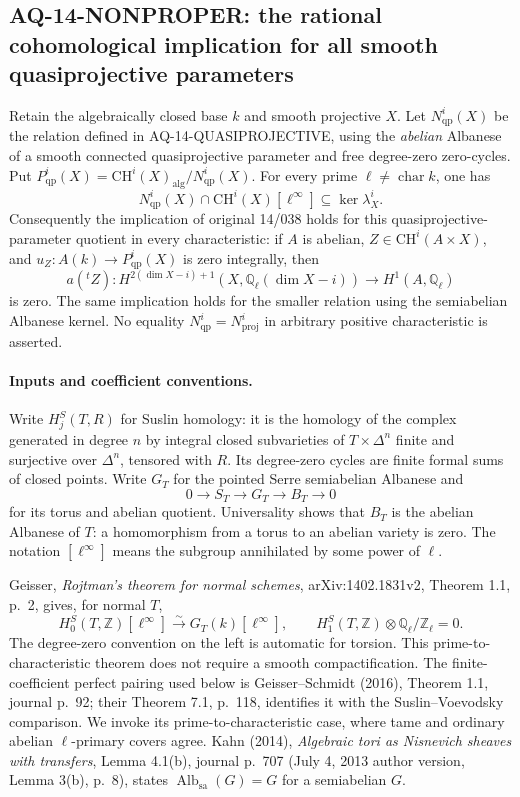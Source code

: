 \subsection{AQ-14-NONPROPER: the rational cohomological implication for all smooth quasiprojective parameters}
Retain the algebraically closed base $k$ and smooth projective $X$.
Let $N^i_{\mathrm{qp}}(X)$ be the relation defined in
AQ-14-QUASIPROJECTIVE, using the \emph{abelian} Albanese of a
smooth connected quasiprojective parameter and free degree-zero
zero-cycles. Put
$P^i_{\mathrm{qp}}(X)=\mathrm{CH}^i(X)_{\mathrm{alg}}/
N^i_{\mathrm{qp}}(X)$. For every prime
$\ell\ne\operatorname{char}k$, one has
\[
 N^i_{\mathrm{qp}}(X)\cap\mathrm{CH}^i(X)[\ell^\infty]
       \subseteq\ker\lambda_X^i.                            \tag{AQ.14.2}
\]
Consequently the implication of original 14/038 holds for this
quasiprojective-parameter quotient in every characteristic:
if $A$ is abelian, $Z\in\mathrm{CH}^i(A\times X)$, and
$u_Z:A(k)\to P^i_{\mathrm{qp}}(X)$ is zero integrally, then
\[
 a({}^tZ):H^{2(\dim X-i)+1}(X,\mathbb Q_\ell(\dim X-i))
                       \longrightarrow H^1(A,\mathbb Q_\ell)
\]
is zero. The same implication holds for the smaller relation
using the semiabelian Albanese kernel. No equality
$N^i_{\mathrm{qp}}=N^i_{\mathrm{proj}}$ in arbitrary positive
characteristic is asserted.

\paragraph{Inputs and coefficient conventions.}
Write $H_j^S(T,R)$ for Suslin homology: it is the homology of
the complex generated in degree $n$ by integral closed
subvarieties of $T\times\Delta^n$ finite and surjective over
$\Delta^n$, tensored with $R$. Its degree-zero cycles are
finite formal sums of closed points. Write $G_T$ for the
pointed Serre semiabelian Albanese and
\[
 0\longrightarrow S_T\longrightarrow G_T\longrightarrow B_T
       \longrightarrow0
\]
for its torus and abelian quotient. Universality shows that
$B_T$ is the abelian Albanese of $T$: a homomorphism from a
torus to an abelian variety is zero. The notation $[\ell^\infty]$
means the subgroup annihilated by some power of $\ell$.

Geisser, \emph{Rojtman's theorem for normal schemes},
arXiv:1402.1831v2, Theorem 1.1, p.~2, gives, for normal $T$,
\[
 H_0^S(T,\mathbb Z)[\ell^\infty]
       \xrightarrow{\sim}G_T(k)[\ell^\infty],\qquad
 H_1^S(T,\mathbb Z)\otimes\mathbb Q_\ell/\mathbb Z_\ell=0.
                                                               \tag{AQ.14.3}
\]
The degree-zero convention on the left is automatic for
torsion. This prime-to-characteristic theorem does not
require a smooth compactification. The finite-coefficient
perfect pairing used below is Geisser--Schmidt (2016),
Theorem 1.1, journal p.~92; their Theorem 7.1, p.~118, identifies it
with the Suslin--Voevodsky comparison. We invoke its
prime-to-characteristic case, where tame and ordinary
abelian $\ell$-primary covers agree. Kahn (2014),
\emph{Algebraic tori as Nisnevich sheaves with transfers},
Lemma 4.1(b), journal p.~707 (July 4, 2013 author version,
Lemma 3(b), p.~8), states
$\operatorname{Alb}_{\mathrm{sa}}(G)=G$ for a semiabelian $G$.

